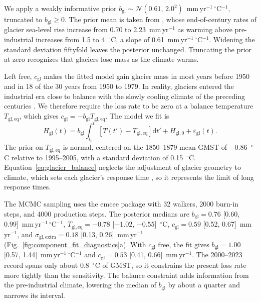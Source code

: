 \documentclass[draft,linenumbers]{agujournal2025}
\begin{document}
We apply a weakly informative prior $b_{\mathrm{gl}} \sim \mathcal{N}(0.61,\,2.0^2)$~mm\,yr$^{-1}$\,$^\circ$C$^{-1}$, truncated to $b_{\mathrm{gl}} \geq 0$. The prior mean is taken from \citet{Rounce2023}, whose end-of-century rates of glacier sea-level rise increase from 0.70 to 2.23~mm\,yr$^{-1}$ as warming above pre-industrial increases from 1.5 to 4~$^\circ$C, a slope of 0.61~mm\,yr$^{-1}$\,$^\circ$C$^{-1}$. Widening the standard deviation fiftyfold leaves the posterior unchanged. Truncating the prior at zero recognizes that glaciers lose mass as the climate warms.

Left free, $c_{\mathrm{gl}}$ makes the fitted model gain glacier mass in most years before 1950 and in 18 of the 30 years from 1950 to 1979. In reality, glaciers entered the industrial era close to balance with the slowly cooling climate of the preceding centuries \citep{Roe2021}. We therefore require the loss rate to be zero at a balance temperature $T_{\mathrm{gl,eq}}$, which gives $c_{\mathrm{gl}} = -b_{\mathrm{gl}}T_{\mathrm{gl,eq}}$. The model we fit is
\begin{equation}
	H_{\mathrm{gl}}(t) = b_{\mathrm{gl}}\int_{t_0}^{t}\left[T(t') - T_{\mathrm{gl,eq}}\right]\mathrm{d}t' + H_{\mathrm{gl},0} + \varepsilon_{\mathrm{gl}}(t).
	\label{eq:glacier_balance}
\end{equation}
The prior on $T_{\mathrm{gl,eq}}$ is normal, centered on the 1850--1879 mean GMST of $-0.86$~$^\circ$C relative to 1995--2005, with a standard deviation of 0.15~$^\circ$C. Equation~\ref{eq:glacier_balance} neglects the adjustment of glacier geometry to climate, which sets each glacier's response time \citep{Roe2021}, so it represents the limit of long response times.

The MCMC sampling uses the emcee package with 32 walkers, 2000 burn-in steps, and 4000 production steps. The posterior medians are $b_{\mathrm{gl}} = 0.76$ [0.60, 0.99]~mm\,yr$^{-1}$\,$^\circ$C$^{-1}$, $T_{\mathrm{gl,eq}} = -0.78$ [$-1.02$, $-0.55$]~$^\circ$C, $c_{\mathrm{gl}} = 0.59$ [0.52, 0.67]~mm\,yr$^{-1}$, and $\sigma_{\mathrm{gl,extra}} = 0.18$ [0.13, 0.26]~mm\,yr$^{-1}$ (Fig.~\ref{fig:component_fit_diagnostics}a). With $c_{\mathrm{gl}}$ free, the fit gives $b_{\mathrm{gl}} = 1.00$ [0.57, 1.44]~mm\,yr$^{-1}$\,$^\circ$C$^{-1}$ and $c_{\mathrm{gl}} = 0.53$ [0.41, 0.66]~mm\,yr$^{-1}$. The 2000--2023 record spans only about 0.8~$^\circ$C of GMST, so it constrains the present loss rate more tightly than the sensitivity. The balance constraint adds information from the pre-industrial climate, lowering the median of $b_{\mathrm{gl}}$ by about a quarter and narrows its interval.
\end{document}
